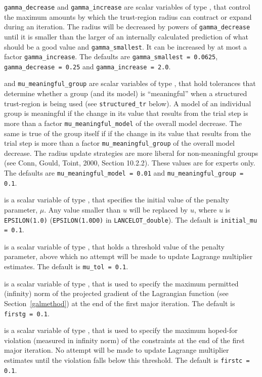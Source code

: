 \documentclass{galahad}
\newcommand{\fullpackagename}{LANC\-E\-LOT}
\begin{document}
\begin{description}
 {\tt gamma\_decrease} and
{\tt gamma\_increase} are scalar variables of type \realdp, that
control the maximum amounts by which the trust-region radius can
contract or expand during an iteration. The radius will be decreased by
powers of {\tt gamma\_decrease} until it is smaller than the larger
of an internally calculated prediction of what should be a good value
and {\tt gamma\_smallest}. It can be increased by at most a factor
{\tt gamma\_increase}.
The defaults are
{\tt gamma\_smallest = 0.0625},
{\tt gamma\_decrease = 0.25} and
{\tt gamma\_increase = 2.0}.

 and
{\tt mu\_meaningful\_group} are scalar variables of type \realdp, that
hold tolerances that determine whether a group (and its model)
is ``meaningful'' when a structured trust-region is being used
(see {\tt structured\_tr} below). A model of an individual group
is meaningful if the change in its value
that results from the trial step is more than a factor
{\tt mu\_meaningful\_model} of the overall model decrease. The
same is true of the group itself if if the change in its value
that results from the trial step is more than a factor
{\tt mu\_meaningful\_group} of the overall model decrease.
The radius update strategies are more liberal for non-meaningful
groups (see Conn, Gould, Toint, 2000, Section 10.2.2).
These values are for experts only.
The defaults are
{\tt mu\_meaningful\_model = 0.01} and
{\tt mu\_meaningful\_group = 0.1}.

 is a scalar variable of type \realdp, that specifies
the initial value of the penalty parameter, $\mu$. Any value smaller than
$u$ will be replaced by $u$,
where $u$ is {\tt EPSILON(1.0)} ({\tt EPSILON(1.0D0)} in
{\tt \fullpackagename\_dou\-ble}).
The default is {\tt initial\_mu = 0.1}.

 is a scalar variable of type \realdp, that holds a
threshold value of the penalty parameter, above which no attempt will be
made to update Lagrange multiplier estimates.
The default is {\tt mu\_tol = 0.1}.

 is a scalar variable of type \realdp, that is used to
specify the maximum permitted (infinity)
norm of the projected gradient of the Lagrangian function
(see Section~\ref{galmethod}) at the end of the first major iteration.
The default is {\tt firstg = 0.1}.

 is a scalar variable of type \realdp, that is used to
specify the maximum hoped-for violation (measured in infinity
norm) of the constraints at the end of the first major iteration.
No attempt will be made to update Lagrange multiplier estimates until the
violation falls below this threshold.
The default is {\tt firstc = 0.1}.


\end{description}
\end{document}
